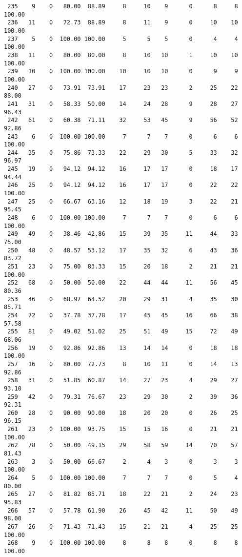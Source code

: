 \begin{verbatim}
 235    9    0   80.00  88.89     8     10    9      0      8     8   100.00
 236   11    0   72.73  88.89     8     11    9      0     10    10   100.00
 237    5    0  100.00 100.00     5      5    5      0      4     4   100.00
 238   11    0   80.00  80.00     8     10   10      1     10    10   100.00
 239   10    0  100.00 100.00    10     10   10      0      9     9   100.00
 240   27    0   73.91  73.91    17     23   23      2     25    22    88.00
 241   31    0   58.33  50.00    14     24   28      9     28    27    96.43
 242   61    0   60.38  71.11    32     53   45      9     56    52    92.86
 243    6    0  100.00 100.00     7      7    7      0      6     6   100.00
 244   35    0   75.86  73.33    22     29   30      5     33    32    96.97
 245   19    0   94.12  94.12    16     17   17      0     18    17    94.44
 246   25    0   94.12  94.12    16     17   17      0     22    22   100.00
 247   25    0   66.67  63.16    12     18   19      3     22    21    95.45
 248    6    0  100.00 100.00     7      7    7      0      6     6   100.00
 249   49    0   38.46  42.86    15     39   35     11     44    33    75.00
 250   48    0   48.57  53.12    17     35   32      6     43    36    83.72
 251   23    0   75.00  83.33    15     20   18      2     21    21   100.00
 252   68    0   50.00  50.00    22     44   44     11     56    45    80.36
 253   46    0   68.97  64.52    20     29   31      4     35    30    85.71
 254   72    0   37.78  37.78    17     45   45     16     66    38    57.58
 255   81    0   49.02  51.02    25     51   49     15     72    49    68.06
 256   19    0   92.86  92.86    13     14   14      0     18    18   100.00
 257   16    0   80.00  72.73     8     10   11      0     14    13    92.86
 258   31    0   51.85  60.87    14     27   23      4     29    27    93.10
 259   42    0   79.31  76.67    23     29   30      2     39    36    92.31
 260   28    0   90.00  90.00    18     20   20      0     26    25    96.15
 261   23    0  100.00  93.75    15     15   16      0     21    21   100.00
 262   78    0   50.00  49.15    29     58   59     14     70    57    81.43
 263    3    0   50.00  66.67     2      4    3      0      3     3   100.00
 264    5    0  100.00 100.00     7      7    7      0      5     4    80.00
 265   27    0   81.82  85.71    18     22   21      2     24    23    95.83
 266   57    0   57.78  61.90    26     45   42     11     50    49    98.00
 267   26    0   71.43  71.43    15     21   21      4     25    25   100.00
 268    9    0  100.00 100.00     8      8    8      0      8     8   100.00

\end{verbatim}
